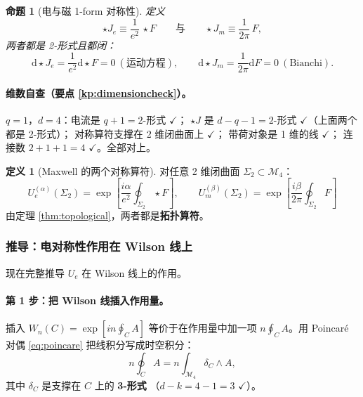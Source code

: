 \documentclass[UTF8,a4paper,11pt]{ctexart}
\theoremstyle{plain}
\newtheorem{proposition}{命题}[section]
\theoremstyle{definition}
\newtheorem{definition}{定义}[section]
\theoremstyle{remark}
\newcommand{\ext}{\mathrm{d}}          %
\newcommand{\hs}{\star}                %
\newcommand{\Mfd}{\mathcal{M}}
\newcommand{\Ssurf}{\Sigma}
\newcommand{\Uop}{U}
\begin{document}
\begin{proposition}[电与磁 1-form 对称性]
定义
\begin{equation}
  \hs J_e\equiv\frac{1}{e^2}\,\hs F
  \qquad\text{与}\qquad
  \hs J_m\equiv\frac{1}{2\pi}\,F ,
  \label{eq:twocurrents}
\end{equation}
两者都是 2-形式且都闭：
\begin{equation}
  \ext\hs J_e=\frac{1}{e^2}\ext\hs F=0\ (\text{运动方程}),
  \qquad
  \ext\hs J_m=\frac{1}{2\pi}\ext F=0\ (\text{Bianchi}) .
\end{equation}
\end{proposition}

\paragraph{维数自查（要点 \ref{kp:dimensioncheck}）。}
$q=1$，$d=4$：电流是 $q+1=2$-形式 $\checkmark$；
$\hs J$ 是 $d-q-1=2$-形式 $\checkmark$（上面两个都是 2-形式）；
对称算符支撑在 2 维闭曲面上 $\checkmark$；
带荷对象是 1 维的线 $\checkmark$；
连接数 $2+1+1=4$ $\checkmark$。全部对上。

\begin{definition}[Maxwell 的两个对称算符]
对任意 2 维闭曲面 $\Ssurf_2\subset\Mfd_4$：
\begin{equation}
  \boxed{\
  \Uop_e^{(\alpha)}(\Ssurf_2)
  =\exp\!\left[\frac{i\alpha}{e^2}\oint_{\Ssurf_2}\hs F\right],
  \qquad
  \Uop_m^{(\beta)}(\Ssurf_2)
  =\exp\!\left[\frac{i\beta}{2\pi}\oint_{\Ssurf_2}F\right] \ }
  \label{eq:maxwellops}
\end{equation}
由定理 \ref{thm:topological}，两者都是\textbf{拓扑算符}。
\end{definition}

\subsubsection{推导：电对称性作用在 Wilson 线上}
\label{subsec:wilson-charge}

现在完整推导 $\Uop_e$ 在 Wilson 线上的作用。

\paragraph{第 1 步：把 Wilson 线插入作用量。}
插入 $W_n(C)=\exp[in\oint_C A]$ 等价于在作用量中加一项
$n\oint_C A$。用 Poincaré 对偶 \eqref{eq:poincare} 把线积分写成时空积分：
\begin{equation}
  n\oint_C A=n\int_{\Mfd_4}\delta_C\wedge A ,
  \label{eq:wilsonsource}
\end{equation}
其中 $\delta_C$ 是支撑在 $C$ 上的 \textbf{3-形式}
（$d-k=4-1=3$ $\checkmark$）。
\end{document}
